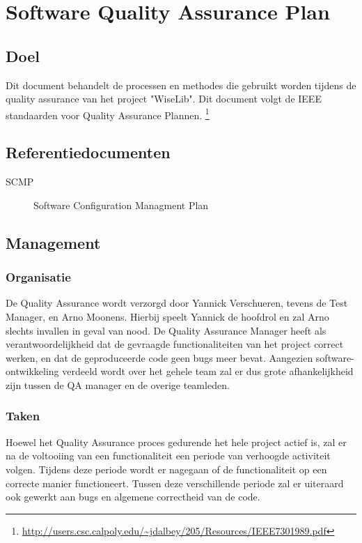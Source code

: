 \section{Software Quality Assurance Plan}
\label{sec:SQAP}
\subsection{Doel}

Dit document behandelt de processen en methodes die gebruikt worden tijdens de quality assurance van het project "WiseLib". Dit document volgt de IEEE standaarden voor Quality Assurance Plannen.
\footnote{\url{http://users.csc.calpoly.edu/~jdalbey/205/Resources/IEEE7301989.pdf}}


\subsection{Referentiedocumenten}

\begin{description}
\item [SCMP] Software Configuration Managment Plan
\end{description}

\subsection{Management}

\subsubsection{Organisatie}

De Quality Assurance wordt verzorgd door Yannick Verschueren, tevens de Test Manager, en Arno Moonens. Hierbij speelt Yannick de hoofdrol en zal Arno slechts invallen in geval van nood. De Quality Assurance Manager heeft als verantwoordelijkheid dat de gevraagde functionaliteiten van het project correct werken, en dat de geproduceerde code geen bugs meer bevat. Aangezien software-ontwikkeling verdeeld wordt over het gehele team zal er dus grote afhankelijkheid zijn tussen de QA manager en de overige teamleden.

\subsubsection{Taken}

Hoewel het Quality Assurance proces gedurende het hele project actief is, zal er na de voltooiing van een functionaliteit een periode van verhoogde activiteit volgen. Tijdens deze periode wordt er nagegaan of de functionaliteit op een correcte manier functioneert.
Tussen deze verschillende periode zal er uiteraard ook gewerkt aan bugs en algemene correctheid van de code.

